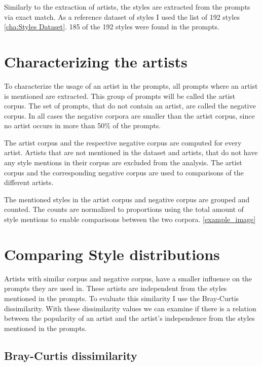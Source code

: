 Similarly to the extraction of artists, the styles are extracted from the prompts via exact match. As a reference dataset of styles I used the list of 192 styles \ref{cha:Styles Dataset}. 185 of the 192 styles were found in the prompts.




\section{Characterizing the artists}

To characterize the usage of an artist in the prompts, all prompts where an artist is mentioned are extracted. This group of prompts will be called the artist corpus.
The set of prompts, that do not contain an artist, are called the negative corpus. In all cases the negative corpora are smaller than the artist corpus, since no artist occurs in more than 50\% of the prompts.

The artist corpus and the respective negative corpus are computed for every artist. Artists that are not mentioned in the dataset and artists, that do not have any style mentions in their corpus are excluded from the analysis. The artist corpus and the corresponding negative corpus are used to comparisons of the different artists.


The mentioned styles in the artist corpus and negative corpus are grouped and counted. The counts are normalized to proportions using the total amount of style mentions to enable comparisons between the two corpora. \ref{example_image}
 


\section{Comparing Style distributions}

Artists with similar corpus and negative corpus, have a smaller influence on the prompts they are used in. These artists are independent from the styles mentioned in the prompts.
To evaluate this similarity I use the Bray-Curtis dissimilarity. 
With these dissimilarity values we can examine if there is a relation between the popularity of an artist and the artist's independence from the styles mentioned in the prompts.


\subsection{Bray-Curtis dissimilarity}

